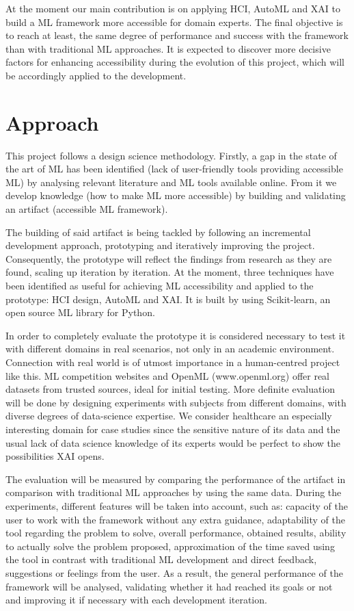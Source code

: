 \documentclass[runningheads]{llncs}
\begin{document}
	At the moment our main contribution is on applying HCI, AutoML and XAI to build a ML framework more
	accessible for domain experts. The final objective is to reach at least, the same degree of performance
	and success with the framework than with traditional ML approaches. It is expected to discover more
	decisive factors for enhancing accessibility during the evolution of this project, which will be
	accordingly applied to the development. 
	
	
	\section{Approach}
	
	This project follows a design science methodology. Firstly, a gap in the state of the art of ML has been
	identified (lack of user-friendly tools providing accessible ML) by analysing relevant literature and 
	ML tools available online. From it we develop knowledge (how to make ML more accessible)
	by building and validating an artifact (accessible ML framework).
	
	The building of said artifact is being tackled by following an incremental development approach,
	prototyping and iteratively improving the project. Consequently, the prototype will
	reflect the findings from research as they are found, scaling up iteration by iteration. 
	At the moment, three techniques have been identified as useful for achieving ML accessibility and
	applied to the prototype: HCI design, AutoML and XAI. It is built by using Scikit-learn, an open source ML library for Python.
	
	In order to completely evaluate the prototype it is considered necessary to test it with different
	domains in real scenarios, not only in an academic environment. Connection with real world is of
	utmost importance in a human-centred project like this. ML competition websites and OpenML
	(www.openml.org) offer real datasets from trusted sources, ideal for initial testing. More definite
	evaluation will be done by designing experiments with subjects from different domains, with diverse
	degrees of data-science expertise. We consider healthcare an especially interesting domain for case 
	studies since the sensitive nature of its data and the usual lack of data science knowledge of its
	experts would be perfect to show the possibilities XAI opens.
	
	The evaluation will be measured by comparing the performance of the artifact in comparison with
	traditional ML approaches by using the same data.  During the experiments, different features will be
	taken into account, such as: capacity of the user to work with the framework without any extra
	guidance, adaptability of the tool regarding the problem to solve, overall performance, obtained
	results, ability to actually solve the problem proposed, approximation of the time saved using the
	tool in contrast with traditional ML development and direct feedback, suggestions or feelings from
	the user. As a result, the general performance of the framework will be analysed, validating
	whether it had reached its goals or not and improving it if necessary with each development iteration.
	
\end{document}
